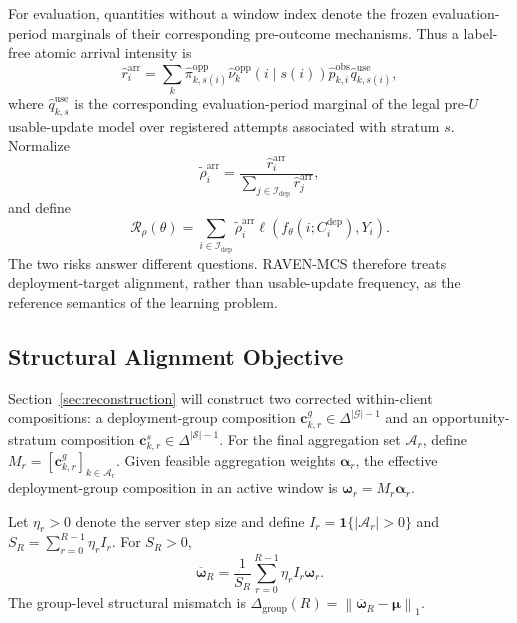 \documentclass[letterpaper,journal]{IEEEtran}
\begin{document}
For evaluation, quantities without a window index denote the frozen
evaluation-period marginals of their corresponding pre-outcome mechanisms.
Thus a label-free atomic arrival intensity is
\begin{equation}
 \widehat r_i^{\mathrm{arr}}
 =
 \sum_k
 \widehat\pi^{\mathrm{opp}}_{k,s(i)}
 \widehat\nu^{\mathrm{opp}}_{k}(i\mid s(i))
 \widehat p^{\mathrm{obs}}_{k,i}
 \widehat q^{\mathrm{use}}_{k,s(i)},
 \label{eq:arrival_intensity}
\end{equation}
where $\widehat q^{\mathrm{use}}_{k,s}$ is the corresponding
evaluation-period marginal of the legal pre-$U$ usable-update model over
registered attempts associated with stratum $s$.  Normalize
\begin{equation}
 \widetilde\rho_i^{\mathrm{arr}}
 =
 \frac{\widehat r_i^{\mathrm{arr}}}
 {\sum_{j\in\mathcal{I}_{\mathrm{dep}}}\widehat r_j^{\mathrm{arr}}},
 \label{eq:arrival_distribution}
\end{equation}
and define
\begin{equation}
 \mathcal{R}_{\rho}(\theta)
 =
 \sum_{i\in\mathcal{I}_{\mathrm{dep}}}
 \widetilde\rho_i^{\mathrm{arr}}
 \ell\!\left(
 f_{\theta}(i;C_i^{\mathrm{dep}}),Y_i
 \right).
 \label{eq:arrival_risk}
\end{equation}
The two risks answer different questions.  RAVEN-MCS therefore treats
deployment-target alignment, rather than usable-update frequency, as the
reference semantics of the learning problem.

\subsection{Structural Alignment Objective}
\label{subsec:design_objective}

Section~\ref{sec:reconstruction} will construct two corrected within-client
compositions: a deployment-group composition
$\mathbf{c}^{g}_{k,r}\in\Delta^{|\mathcal{G}|-1}$ and an opportunity-stratum
composition $\mathbf{c}^{s}_{k,r}\in\Delta^{|\mathcal{S}|-1}$.  For the final
aggregation set $\mathcal{A}_r$, define
$M_r=[\mathbf{c}^{g}_{k,r}]_{k\in\mathcal{A}_r}$.
Given feasible aggregation weights $\boldsymbol\alpha_r$, the effective
deployment-group composition in an active window is
$\boldsymbol\omega_r=M_r\boldsymbol\alpha_r$.

Let $\eta_r>0$ denote the server step size and define
$I_r=\mathbf{1}\{|\mathcal{A}_r|>0\}$ and
$S_R=\sum_{r=0}^{R-1}\eta_r I_r$.
For $S_R>0$,
\begin{equation}
    \overline{\boldsymbol\omega}_R
    =
    \frac{1}{S_R}
    \sum_{r=0}^{R-1}
    \eta_r I_r\boldsymbol\omega_r.
    \label{eq:omega_bar}
\end{equation}
The group-level structural mismatch is
$\Delta_{\mathrm{group}}(R)=\left\|
\overline{\boldsymbol\omega}_R-\boldsymbol\mu
\right\|_1$.
\end{document}
